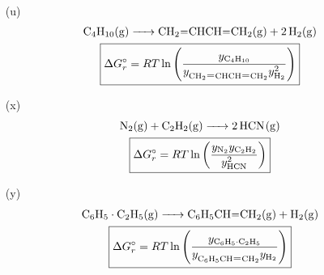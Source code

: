 \begin{solution}
\begin{enumerate}
\begin{gather*}
      \end{gather*}
    \item[(u)]
      \begin{gather*}
        \ce{C4H10(g) -> CH2=CHCH=CH2(g) + 2H2(g)} \\
        \boxed{\Delta G_r^\circ =
        RT\ln\left(\frac{y_{\ce{C4H10}}}{y_{\ce{CH2=CHCH=CH2}}y_{\ce{H2}}^2}\right)}
      \end{gather*}
    \item[(x)]
      \begin{gather*}
        \ce{N2(g) + C2H2(g) -> 2HCN(g)} \\
        \boxed{\Delta G_r^\circ =
        RT\ln\left(\frac{y_{\ce{N2}}y_{\ce{C2H2}}}{y_{\ce{HCN}}^2}\right)}
      \end{gather*}
    \item[(y)]
      \begin{gather*}
        \ce{C6H5\cdot C2H5(g) -> C6H5CH=CH2(g) + H2(g)} \\
        \boxed{\Delta G_r^\circ =
          RT\ln\left(\frac{y_{\ce{C6H5\cdot
        C2H5}}}{y_{\ce{C6H5CH=CH2}}y_{\ce{H2}}}\right)}
      \end{gather*}
  \end{enumerate}
\end{solution}

%


